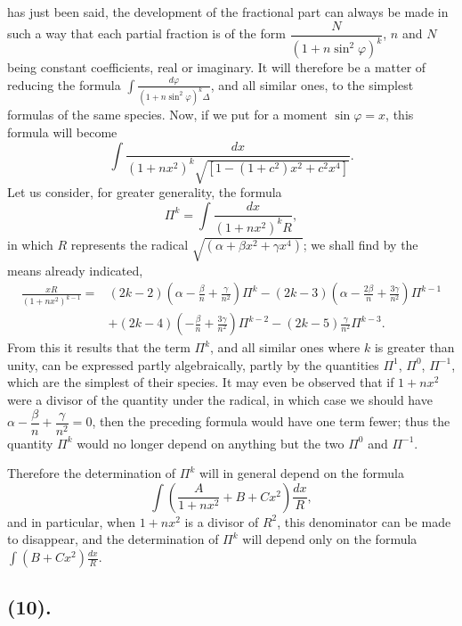 \documentclass{article}
\begin{document}
has just been said, the development of the fractional part can always be made in such a way that each partial fraction is of the form $\dfrac{N}{(1+n\sin^{2}\varphi)^{k}}$, $n$ and $N$ being constant coefficients, real or imaginary. It will therefore be a matter of reducing the formula $\displaystyle\int\frac{d\varphi}{(1+n\sin^{2}\varphi)^{k}\Delta}$, and all similar ones, to the simplest formulas of the same species. Now, if we put for a moment $\sin\varphi=x$, this formula will become
\[ \int\frac{dx}{(1+nx^{2})^{k}\sqrt{[1-(1+c^{2})x^{2}+c^{2}x^{4}]}}. \]
Let us consider, for greater generality, the formula
\[ \Pi^{k}=\int\frac{dx}{(1+nx^{2})^{k}R}, \]
in which $R$ represents the radical $\sqrt{(\alpha+\beta x^{2}+\gamma x^{4})}$; we shall find by the means already indicated,
\[ \begin{aligned} \frac{xR}{(1+nx^{2})^{k-1}}={}&(2k-2)\left(\alpha-\frac{\beta}{n}+\frac{\gamma}{n^{2}}\right)\Pi^{k}-(2k-3)\left(\alpha-\frac{2\beta}{n}+\frac{3\gamma}{n^{2}}\right)\Pi^{k-1}\\ &+(2k-4)\left(-\frac{\beta}{n}+\frac{3\gamma}{n^{2}}\right)\Pi^{k-2}-(2k-5)\frac{\gamma}{n^{2}}\Pi^{k-3}. \end{aligned} \]
From this it results that the term $\Pi^{k}$, and all similar ones where $k$ is greater than unity, can be expressed partly algebraically, partly by the quantities $\Pi^{1}$, $\Pi^{0}$, $\Pi^{-1}$, which are the simplest of their species. It may even be observed that if $1+nx^{2}$ were a divisor of the quantity under the radical, in which case we should have $\alpha-\dfrac{\beta}{n}+\dfrac{\gamma}{n^{2}}=0$, then the preceding formula would have one term fewer; thus the quantity $\Pi^{k}$ would no longer depend on anything but the two $\Pi^{0}$ and $\Pi^{-1}$.

Therefore the determination of $\Pi^{k}$ will in general depend on the formula
\[ \int\left(\frac{A}{1+nx^{2}}+B+Cx^{2}\right)\frac{dx}{R}, \]
and in particular, when $1+nx^{2}$ is a divisor of $R^{2}$, this denominator can be made to disappear, and the determination of $\Pi^{k}$ will depend only on the formula $\displaystyle\int(B+Cx^{2})\frac{dx}{R}$.


\subsection*{(10).}
\end{document}
